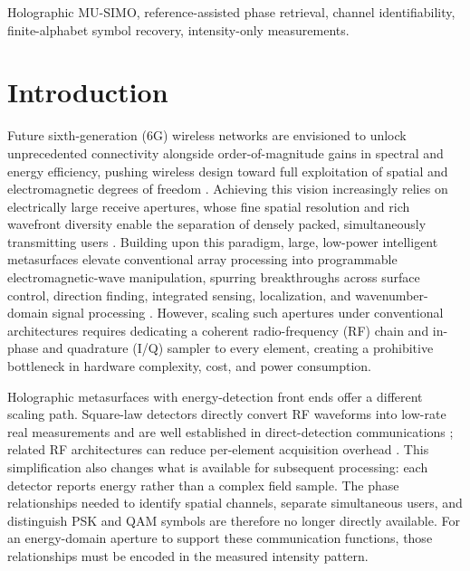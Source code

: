 \documentclass[journal]{IEEEtran}
\begin{document}
\begin{IEEEkeywords}
Holographic MU-SIMO, reference-assisted phase retrieval, channel identifiability, finite-alphabet symbol recovery, intensity-only measurements.
\end{IEEEkeywords}

\section{Introduction}
\label{sec:introduction}

Future sixth-generation (6G) wireless networks are envisioned to unlock unprecedented connectivity alongside order-of-magnitude gains in spectral and energy efficiency, pushing wireless design toward full exploitation of spatial and electromagnetic degrees of freedom \cite{hu2018data,dardari2020large}. Achieving this vision increasingly relies on electrically large receive apertures, whose fine spatial resolution and rich wavefront diversity enable the separation of densely packed, simultaneously transmitting users \cite{r2,NEholo}. Building upon this paradigm, large, low-power intelligent metasurfaces elevate conventional array processing into programmable electromagnetic-wave manipulation, spurring breakthroughs across surface control, direction finding, integrated sensing, localization, and wavenumber-domain signal processing \cite{huang2020holographic,zhang2021holographic,fuhai,li2026intelligent,cao2026hybrid,zhang2026wavenumber}. However, scaling such apertures under conventional architectures requires dedicating a coherent radio-frequency (RF) chain and in-phase and quadrature (I/Q) sampler to every element, creating a prohibitive bottleneck in hardware complexity, cost, and power consumption.

Holographic metasurfaces with energy-detection front ends offer a different scaling path. Square-law detectors directly convert RF waveforms into low-rate real measurements and are well established in direct-detection communications \cite{kahn1997wireless,armstrong2009ofdm}; related RF architectures can reduce per-element acquisition overhead \cite{shen2020intelligent}. This simplification also changes what is available for subsequent processing: each detector reports energy rather than a complex field sample. The phase relationships needed to identify spatial channels, separate simultaneous users, and distinguish PSK and QAM symbols are therefore no longer directly available. For an energy-domain aperture to support these communication functions, those relationships must be encoded in the measured intensity pattern.
\end{document}
